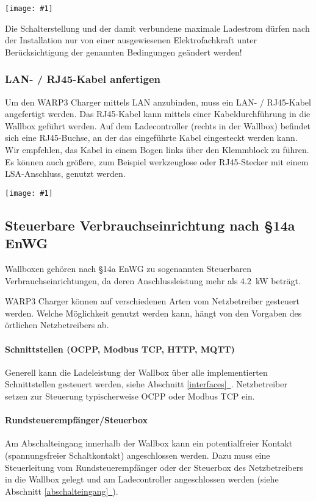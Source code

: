 \documentclass[a4paper,10pt]{article}
\newcommand{\hint}[1]{\begin{tcolorbox}[colback=boxgray,colframe=black,coltext=
white,title=Hinweis,left*=2mm,right*=2mm,boxsep=1mm,bottom=1mm,top=1mm]#1\end{tcolorbox}}
\newcommand{\gfx}[1]{\texttt{[image: \#1]}}
\newcommand*{\fullref}[1]{Abschnitt \hyperref[{#1}]{\ref*{#1}~\nameref*{#1}}}
\begin{document}
\begin{multicols*}{2}
    \gfx{./img_warp3/resized/warp3_switches.jpg}

    \hint{Die Schalterstellung und der damit verbundene maximale Ladestrom dürfen nach der
          Installation nur von einer ausgewiesenen Elektrofachkraft unter
          Berücksichtigung der genannten Bedingungen geändert werden!}

    \subsubsection{LAN- / RJ45-Kabel anfertigen}\label{ethernet} 

    Um den WARP3 Charger mittels LAN anzubinden, muss ein LAN- / RJ45-Kabel
    angefertigt werden. Das RJ45-Kabel kann mittels einer
    Kabeldurchführung in die Wallbox geführt werden. Auf dem Ladecontroller
	(rechts in der Wallbox) befindet sich eine RJ45-Buchse, an der das
	eingeführte Kabel eingesteckt werden kann. Wir empfehlen, das Kabel
	in einem Bogen links über den Klemmblock zu führen.
	Es können auch größere, zum Beispiel werkzeuglose oder RJ45-Stecker
	mit einem LSA-Anschluss, genutzt werden.

    \gfx{./img_warp3/resized/warp3_pro_open_highlighted_LAN.jpg} %

    \subsection{Steuerbare Verbrauchseinrichtung nach \S14a EnWG}\label{s14enwg}
    Wallboxen gehören nach \S14a EnWG zu sogenannten Steuerbaren
    Verbrauchseinrichtungen, da deren Anschlussleistung mehr als \SI{4,2}{\kilo\watt} beträgt.

    WARP3 Charger können auf verschiedenen Arten vom Netzbetreiber gesteuert werden.
    Welche Möglichkeit genutzt werden kann, hängt von den Vorgaben des örtlichen Netzbetreibers ab.

    \paragraph*{Schnittstellen (OCPP, Modbus TCP, HTTP, MQTT)}
    Generell kann die Ladeleistung der Wallbox über alle implementierten Schnittstellen gesteuert werden, siehe \fullref{interfaces}.
    Netzbetreiber setzen zur Steuerung typischerweise OCPP oder Modbus TCP ein.

    \paragraph*{Rundsteuerempfänger/Steuerbox}
    Am Abschalteingang innerhalb der Wallbox kann ein potentialfreier Kontakt (spannungsfreier Schaltkontakt)
    angeschlossen werden. Dazu muss eine Steuerleitung vom Rundsteuerempfänger
    oder der Steuerbox des Netzbetreibers in die Wallbox gelegt und am
	Ladecontroller angeschlossen werden (siehe \fullref{abschalteingang}).


\end{multicols*}
\end{document}

